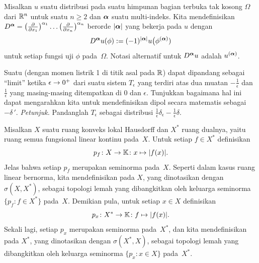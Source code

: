 \begin{defn} Misalkan $u$ suatu distribusi pada suatu himpunan bagian terbuka tak kosong $\Omega$ dari $\mathbb{R}^n$ untuk suatu $n \ge 2$ dan $\boldsymbol{\alpha}$
suatu multi-indeks. Kita mendefinisikan
 $D^{\boldsymbol{\alpha}} = \bigl(\frac{\partial}{\partial x_1}\bigr)^{\alpha_1} \dots
\bigl(\frac{\partial}{\partial x_n}\bigr)^{\alpha_n}$ berorde $\lvert\boldsymbol{\alpha}\rvert$ yang bekerja pada $u$ dengan
   \[ D^{\boldsymbol{\alpha}}u(\phi) := (-1)^{\lvert\boldsymbol{\alpha}\rvert}u\bigl(\phi^{(\boldsymbol{\alpha})}) \]
untuk setiap fungsi uji $\phi$ pada~$\Omega$.
Notasi alternatif untuk $D^{\boldsymbol{\alpha}}u$ adalah $u^{(\boldsymbol{\alpha})}$.
\end{defn}

\begin{exer} Suatu  (dengan momen listrik 1 di titik asal pada $\mathbb{R}$) dapat dipandang sebagai ``limit'' ketika $\epsilon \rightarrow 0^+$
dari suatu sistem $T_\epsilon$ yang terdiri atas dua muatan $-\frac1\epsilon$ dan $\frac1\epsilon$ yang masing-masing ditempatkan di $0$ dan $\epsilon$. Tunjukkan
bagaimana hal ini dapat mengarahkan kita untuk mendefinisikan dipol secara matematis sebagai $-\delta\,'$. \emph{Petunjuk.} Pandanglah $T_\epsilon$ sebagai
distribusi $\frac1\epsilon \delta_\epsilon - \frac1\epsilon \delta$.
\end{exer}
 
\begin{defn} Misalkan $X$ suatu ruang konveks lokal Hausdorff dan $X^*$ ruang dualnya, yaitu ruang semua
fungsional linear kontinu pada~$X$. Untuk setiap $f \in X^*$ definisikan
  \[ p_f\colon X \rightarrow \mathbb{K}\colon x \mapsto \lvert f(x)\rvert. \]
Jelas bahwa setiap $p_f$ merupakan seminorma pada~$X$. Seperti dalam kasus ruang linear bernorma, kita mendefinisikan
 pada $X$, yang dinotasikan dengan $\sigma(X,X^*)$, sebagai topologi lemah yang dibangkitkan oleh keluarga seminorma
$\{p_f\colon f \in X^*\}$ pada~$X$. Demikian pula, untuk setiap $x \in X$ definisikan
   \[ p_x\colon X^* \rightarrow \mathbb{K} \colon f \mapsto \lvert f(x)\rvert. \]
Sekali lagi, setiap $p_x$ merupakan seminorma pada~$X^*$, dan kita mendefinisikan
 pada $X^*$, yang dinotasikan dengan $\sigma(X^*,X)$, sebagai topologi lemah yang dibangkitkan oleh keluarga seminorma
$\{p_x\colon x \in X\}$ pada~$X^*$.
\end{defn}

